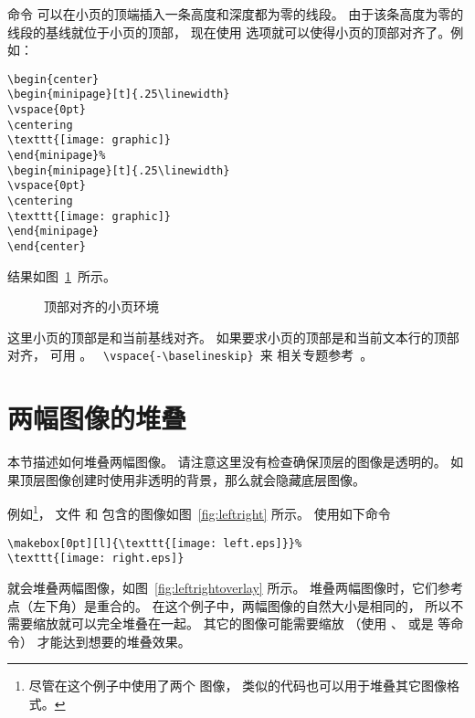 命令  可以在小页的顶端插入一条高度和深度都为零的线段。
由于该条高度为零的线段的基线就位于小页的顶部，
现在使用 \opt{[t]} 选项就可以使得小页的顶部对齐了。例如：
\begin{lstlisting}
\begin{center}
\begin{minipage}[t]{.25\linewidth}
\vspace{0pt}
\centering
\texttt{[image: graphic]}
\end{minipage}%
\begin{minipage}[t]{.25\linewidth}
\vspace{0pt}
\centering
\texttt{[image: graphic]}
\end{minipage}
\end{center}
\end{lstlisting}
结果如图~\ref{fig:minipagesamp-3}~所示。
\begin{figure}
\begin{center}
	\begin{minipage}[t]{.25\linewidth}
		\vspace{0pt}
		\centering
		\resizebox{1in}{!}{\usebox{\boxgraphic}}
	\end{minipage}%
	\begin{minipage}[t]{.25\linewidth}
		\vspace{0pt}
		\centering
	\end{minipage}
\end{center}
\caption{顶部对齐的小页环境}\label{fig:minipagesamp-3}
\end{figure}

这里小页的顶部是和当前基线对齐。
如果要求小页的顶部是和当前文本行的顶部对齐，
可用 。
  ~\verb+\vspace{-\baselineskip}+~来
相关专题参考~\cite[第~863--865~页]{Mittelbach2004}。


\section{两幅图像的堆叠}
本节描述如何堆叠两幅图像。
请注意这里没有检查确保顶层的图像是透明的。
如果顶层图像创建时使用非透明的背景，那么就会隐藏底层图像。

例如\footnote{
	尽管在这个例子中使用了两个  图像，
	类似的代码也可以用于堆叠其它图像格式。
}，
文件  和  包含的图像如图~\ref{fig:leftright} 所示。
使用如下命令
\begin{lstlisting}
\makebox[0pt][l]{\texttt{[image: left.eps]}}%
\texttt{[image: right.eps]}
\end{lstlisting}
就会堆叠两幅图像，如图~\ref{fig:leftrightoverlay} 所示。
堆叠两幅图像时，它们参考点（左下角）是重合的。
在这个例子中，两幅图像的自然大小是相同的，
所以不需要缩放就可以完全堆叠在一起。
其它的图像可能需要缩放
（使用 、 或是  等命令）
才能达到想要的堆叠效果。

